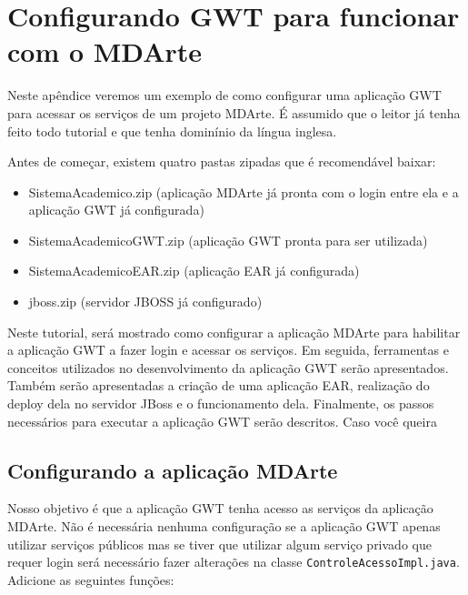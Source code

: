 \chapter{Configurando GWT para funcionar com o MDArte}
\label{gwt-config}
Neste apêndice veremos um exemplo de como configurar uma aplicação GWT para acessar os serviços de um projeto MDArte. É assumido
que o leitor já tenha feito todo tutorial e que tenha dominínio da língua inglesa.

Antes de começar, existem quatro pastas zipadas que é recomendável baixar:

\begin{itemize}
  \item SistemaAcademico.zip (aplicação MDArte já pronta com o login entre ela
  e a aplicação GWT já configurada)
  \item SistemaAcademicoGWT.zip (aplicação GWT pronta para ser utilizada)
  \item SistemaAcademicoEAR.zip (aplicação EAR já configurada)
  \item jboss.zip (servidor JBOSS já configurado)
\end{itemize}

Neste tutorial, será mostrado como configurar a aplicação MDArte para habilitar a aplicação GWT a fazer login e acessar os
serviços. Em seguida, ferramentas e conceitos utilizados no desenvolvimento da aplicação GWT serão apresentados. Também serão
apresentadas a criação de uma aplicação EAR, realização do deploy dela no servidor JBoss e o funcionamento dela. Finalmente, os
passos necessários para executar a aplicação GWT serão descritos. Caso você queira

\section{Configurando a aplicação MDArte}

Nosso objetivo é que a aplicação GWT tenha acesso as serviços da aplicação MDArte. Não é necessária nenhuma configuração se a
aplicação GWT apenas utilizar serviços públicos mas se tiver que utilizar algum serviço privado que requer login será necessário
fazer alterações na classe \texttt{ControleAcessoImpl.java}. Adicione as seguintes funções:

